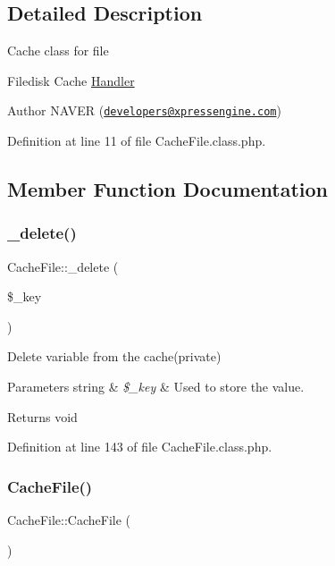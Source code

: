 \subsection{Detailed Description}
Cache class for file

Filedisk Cache \hyperlink{classHandler}{Handler}

\begin{DoxyAuthor}{Author}
N\+A\+V\+ER (\href{mailto:developers@xpressengine.com}{\tt developers@xpressengine.\+com}) 
\end{DoxyAuthor}


Definition at line 11 of file Cache\+File.\+class.\+php.



\subsection{Member Function Documentation}
\mbox{\label{classCacheFile_a59058fb815de83e25ec107fec5dff2d2}} 
\subsubsection{\texorpdfstring{\+\_\+delete()}{\_delete()}}
{\footnotesize\ttfamily Cache\+File\+::\+\_\+delete (\begin{DoxyParamCaption}\item[{}]{\$\+\_\+key }\end{DoxyParamCaption})}

Delete variable from the cache(private)


\begin{DoxyParams}[1]{Parameters}
string & {\em \$\+\_\+key} & Used to store the value. \\
\hline
\end{DoxyParams}
\begin{DoxyReturn}{Returns}
void 
\end{DoxyReturn}


Definition at line 143 of file Cache\+File.\+class.\+php.

\mbox{\label{classCacheFile_a989f8b586fb83812f1c0ab1e3f2e302a}} 
\subsubsection{\texorpdfstring{Cache\+File()}{CacheFile()}}
{\footnotesize\ttfamily Cache\+File\+::\+Cache\+File (\begin{DoxyParamCaption}{ }\end{DoxyParamCaption})}

